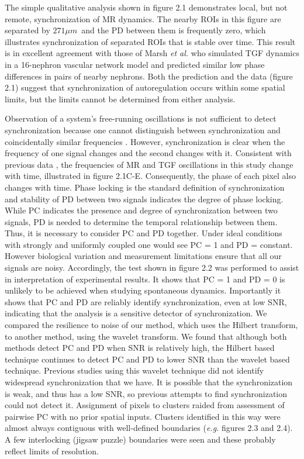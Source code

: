 	The simple qualitative analysis shown in figure 2.1 demonstrates local, but not remote, synchronization of MR dynamics. The nearby ROIs in this figure are separated by $271\mu m$\ and the PD between them is frequently zero, which illustrates synchronization of separated ROIs that is stable over time. This result is in excellent agreement with those of Marsh \emph{et al.} \cite{Marsh13} who simulated TGF dynamics in a 16-nephron vascular network model and predicted similar low phase differences in pairs of nearby nephrons. Both the prediction \cite{Marsh13} and the data (figure 2.1) suggest that synchronization of autoregulation occurs within some spatial limits, but the limits cannot be determined from either analysis.
	
	Observation of a system's free-running oscillations is not sufficient to detect synchronization because one cannot distinguish between synchronization and coincidentally similar frequencies \cite{Pikovsky01}. However, synchronization is clear when the frequency of one signal changes and the second changes with it. Consistent with previous data \cite{Zou02,HolsteinRathlou11,Chon08}, the frequencies of MR and TGF oscillations in this study change with time, illustrated in figure 2.1C-E. Consequently, the phase of each pixel also changes with time. Phase locking is the standard definition of synchronization \cite{Balanov08,Pikovsky01} and stability of PD between two signals indicates the degree of phase locking. While PC indicates the presence and degree of synchronization between two signals, PD is needed to determine the temporal relationship between them. Thus, it is necessary to consider PC and PD together. Under ideal conditions with strongly and uniformly coupled one would see PC = 1 and PD = constant. However biological variation and measurement limitations ensure that all our signals are noisy. Accordingly, the test shown in figure 2.2 was performed to assist in interpretation of experimental results. It shows that PC = 1 and PD = 0 is unlikely to be achieved when studying spontaneous dynamics. Importantly it shows that PC and PD are reliably identify synchronization, even at low SNR, indicating that the analysis is a sensitive detector of synchronization. We compared the resilience to noise of our method, which uses the Hilbert transform, to another method, using the wavelet transform. We found that although both methods detect PC and PD when SNR is relatively high, the Hilbert based technique continues to detect PC and PD to lower SNR than the wavelet based technique. Previous studies using this wavelet technique \cite{HolsteinRathlou11} did not identify widespread synchronization that we have. It is possible that the synchronization is weak, and thus has a low SNR, so previous attempts to find synchronization could not detect it. Assignment of pixels to clusters raided from assessment of pairwise PC with no prior spatial inputs. Clusters identified in this way were almost always contiguous with well-defined boundaries (\emph{e.g.} figures 2.3 and 2.4). A few interlocking (jigsaw puzzle) boundaries were seen and these probably reflect limits of resolution.
	
